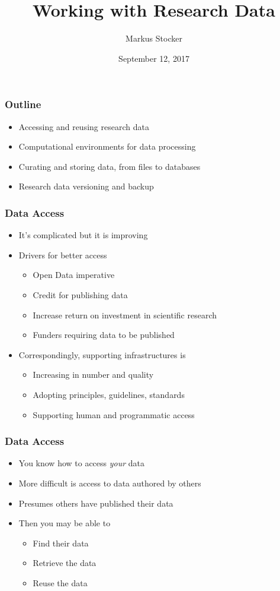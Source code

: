 \documentclass{beamer}
\title{Working with Research Data}
\author{Markus Stocker}
\date{September 12, 2017}
\begin{document}
\maketitle

\begin{frame}
  \frametitle{Outline}
  
  \begin{itemize}
  \item Accessing and reusing research data
  \item Computational environments for data processing
  \item Curating and storing data, from files to databases
  \item Research data versioning and backup
  \end{itemize}
\end{frame}

\begin{frame}
  \frametitle{Data Access}
  
  \begin{itemize}
  \item It's complicated but it is improving
  \item Drivers for better access
  \begin{itemize}
  \item Open Data imperative
  \item Credit for publishing data
  \item Increase return on investment in scientific research
  \item Funders requiring data to be published
  \end{itemize}
  \item Correspondingly, supporting infrastructures is
  \begin{itemize}
  \item Increasing in number and quality
  \item Adopting principles, guidelines, standards
  \item Supporting human and programmatic access
  \end{itemize}
  \end{itemize}
\end{frame}

\begin{frame}
  \frametitle{Data Access}
  
  \begin{itemize}
  \item You know how to access \emph{your} data
  \item More difficult is access to data authored by others
  \item Presumes others have published their data
  \item Then you may be able to
  \begin{itemize}
  \item Find their data
  \item Retrieve the data
  \item Reuse the data
  \end{itemize}
  \end{itemize}
\end{frame}
\end{document}
